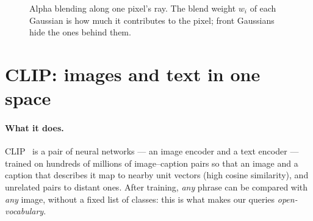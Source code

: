 \documentclass[11pt,a4paper]{article}
\newcommand{\vect}[1]{\mathbf{#1}}
\begin{document}
\begin{figure}[ht]
\centering
{}
\caption{Alpha blending along one pixel's ray. The blend weight $w_i$ of each Gaussian is how much it contributes to
the pixel; front Gaussians hide the ones behind them.}
\label{fig:blend}
\end{figure}

\section{CLIP: images and text in one space}

\paragraph{What it does.} CLIP~\cite{clip} is a pair of neural networks --- an image encoder and a text encoder ---
trained on hundreds of millions of image--caption pairs so that an image and a caption that describes it map to
nearby unit vectors (high cosine similarity), and unrelated pairs to distant ones. After training, \emph{any} phrase
can be compared with \emph{any} image, without a fixed list of classes: this is what makes our queries
\emph{open-vocabulary}.
\end{document}
